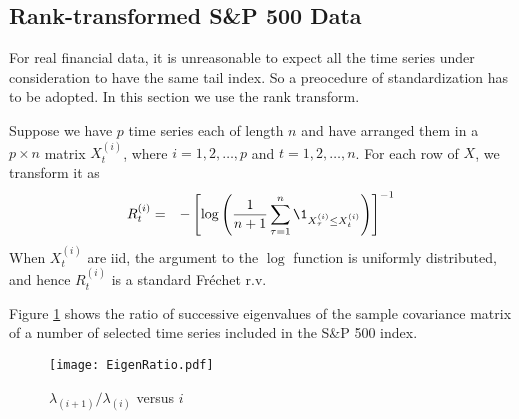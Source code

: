 \subsection{Rank-transformed S\&P 500 Data}

For real financial data, it is unreasonable to expect all
the time series under consideration to have the same tail index. So a
preocedure of standardization has to be adopted. In this section we
use the rank transform.

Suppose we have $p$ time series each of length $n$ and have arranged
them in a $p\times n$ matrix $X_t^{(i)}$, where $i = 1, 2, \dots, p$ and
$t=1,2, \dots, n$. For each row of $X$, we transform it as
\begin{eqnarray*}
  R_t^{(i)} &=& -\left[
    \log \left({1 \over n+1} \sum_{\tau=1}^n \1_{X_\tau^{(i)} \leq X_{t}^{(i)}} \right)
  \right]^{-1}
\end{eqnarray*}
When $X_t^{(i)}$ are iid, the argument to the $\log$ function is
uniformly distributed, and hence $R_t^{(i)}$ is a standard Fr\'echet r.v.

Figure \ref{fig:EigenRatio} shows the ratio of successive eigenvalues
of the sample covariance matrix of a number of selected time series
included in the S\&P 500 index.
\begin{figure}[htb!]
  \centering
  \texttt{[image: EigenRatio.pdf]}
  \caption{$\lambda_{(i+1)} / \lambda_{(i)}$ versus $i$}
  \label{fig:EigenRatio}
\end{figure}
